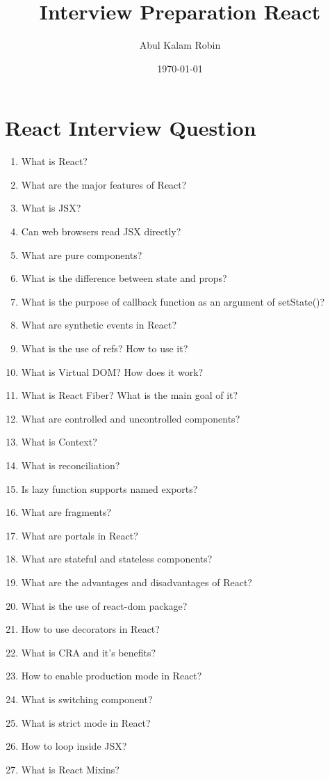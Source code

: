 \documentclass[11pt]{article}
\author{Abul Kalam Robin}
\date{\today}
\title{Interview Preparation React}
\begin{document}
\maketitle

\section*{React Interview Question}
\label{sec:org0d7e665}
\begin{enumerate}
\item What is React?
\item What are the major features of React?
\item What is JSX?
\item Can web browsers read JSX directly?
\item What are pure components?
\item What is the difference between state and props?
\item What is the purpose of callback function as an argument of setState()?
\item What are synthetic events in React?
\item What is the use of refs? How to use it?
\item What is Virtual DOM? How does it work?
\item What is React Fiber? What is the main goal of it?
\item What are controlled and uncontrolled components?
\item What is Context?
\item What is reconciliation?
\item Is lazy function supports named exports?
\item What are fragments?
\item What are portals in React?
\item What are stateful and stateless components?
\item What are the advantages and disadvantages of React?
\item What is the use of react-dom package?
\item How to use decorators in React?
\item What is CRA and it's benefits?
\item How to enable production mode in React?
\item What is switching component?
\item What is strict mode in React?
\item How to loop inside JSX?
\item What is React Mixins?

\end{enumerate}
\end{document}

